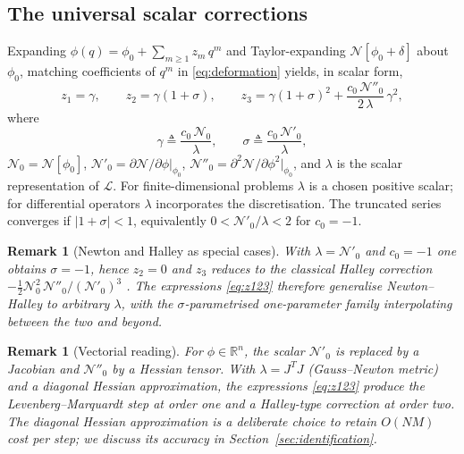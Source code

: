 \documentclass[preprint,12pt,numbers]{elsarticle}
\newtheorem{remark}[theorem]{Remark}
\begin{document}
\subsection{The universal scalar corrections}

Expanding $\phi(q) = \phi_0 + \sum_{m \geq 1} z_m\,q^m$ and Taylor-expanding
$\mathcal{N}[\phi_0 + \delta]$ about $\phi_0$, matching coefficients of
$q^m$ in \eqref{eq:deformation} yields, in scalar form,
\begin{equation}
\boxed{\;
z_1 = \gamma, \qquad
z_2 = \gamma(1+\sigma), \qquad
z_3 = \gamma(1+\sigma)^2 + \frac{c_0\,\mathcal{N}''_0}{2\,\lambda}\,\gamma^2,
\;}
\label{eq:z123}
\end{equation}
where
\begin{equation}
\gamma \triangleq \frac{c_0\,\mathcal{N}_0}{\lambda}, \qquad
\sigma \triangleq \frac{c_0\,\mathcal{N}'_0}{\lambda},
\label{eq:gamma-sigma}
\end{equation}
$\mathcal{N}_0 = \mathcal{N}[\phi_0]$, $\mathcal{N}'_0 = \partial\mathcal{N}/\partial\phi\big|_{\phi_0}$,
$\mathcal{N}''_0 = \partial^2\mathcal{N}/\partial\phi^2\big|_{\phi_0}$,
and $\lambda$ is the scalar representation of $\mathcal{L}$. For
finite-dimensional problems $\lambda$ is a chosen positive scalar; for
differential operators $\lambda$ incorporates the discretisation. The
truncated series converges if $|1+\sigma| < 1$, equivalently
$0 < \mathcal{N}'_0/\lambda < 2$ for $c_0 = -1$.

\begin{remark}[Newton and Halley as special cases]
With $\lambda = \mathcal{N}'_0$ and $c_0 = -1$ one obtains $\sigma = -1$,
hence $z_2 = 0$ and $z_3$ reduces to the classical Halley correction
$-\tfrac{1}{2}\mathcal{N}_0^2\,\mathcal{N}''_0/(\mathcal{N}'_0)^3$
\cite{Gutierrez1997}. The expressions \eqref{eq:z123} therefore
generalise Newton--Halley to arbitrary $\lambda$, with the
$\sigma$-parametrised one-parameter family interpolating between the
two and beyond.
\end{remark}

\begin{remark}[Vectorial reading]
For $\phi \in \mathbb{R}^n$, the scalar $\mathcal{N}'_0$ is replaced by a
Jacobian and $\mathcal{N}''_0$ by a Hessian tensor. With $\lambda = J^TJ$
(Gauss--Newton metric) and a diagonal Hessian approximation, the
expressions \eqref{eq:z123} produce the Levenberg--Marquardt step at
order one and a Halley-type correction at order two. The diagonal
Hessian approximation is a deliberate choice to retain $O(NM)$ cost per
step; we discuss its accuracy in Section~\ref{sec:identification}.
\end{remark}
\end{document}
